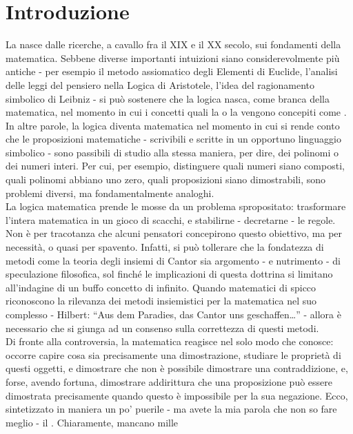 \section{Introduzione}
La  nasce dalle ricerche, a cavallo fra il XIX e il XX secolo, sui fondamenti della matematica. Sebbene diverse importanti intuizioni siano considerevolmente più antiche - per esempio il 
metodo assiomatico degli Elementi di Euclide, l'analisi delle leggi del pensiero nella Logica di Aristotele, l'idea del ragionamento simbolico di Leibniz - si può sostenere che la logica nasca, come branca della matematica, nel momento 
in cui i concetti quali la  o la  vengono concepiti come . In altre parole, la logica diventa matematica nel momento in cui si rende conto che 
le proposizioni matematiche - scrivibili e scritte in un opportuno linguaggio simbolico - sono passibili di studio alla stessa maniera, per dire, dei polinomi o dei numeri interi. Per cui, per esempio,
distinguere quali numeri siano composti, quali polinomi abbiano uno zero, quali proposizioni siano dimostrabili, sono problemi diversi, ma fondamentalmente analoghi.\\
La logica matematica prende le mosse da un problema spropositato: trasformare l'intera matematica in un gioco di scacchi, e stabilirne - decretarne - le regole. Non è per tracotanza che alcuni pensatori concepirono questo obiettivo, ma per necessità, o quasi per spavento.
Infatti, si può tollerare che la fondatezza di metodi come la teoria degli insiemi di Cantor sia argomento - e nutrimento - di speculazione filosofica, sol finché le implicazioni di questa dottrina si limitano all'indagine di un buffo concetto di infinito.
Quando matematici di spicco riconoscono la rilevanza dei metodi insiemistici per la matematica nel suo complesso - Hilbert: ``Aus dem Paradies, das Cantor uns geschaffen\ldots'' - allora è necessario che si giunga ad un consenso sulla correttezza di questi metodi.\\
Di fronte alla controversia, la matematica reagisce nel solo modo che conosce: occorre capire cosa sia precisamente una dimostrazione, studiare le proprietà di questi oggetti, e dimostrare che non è possibile dimostrare una contraddizione, e, forse, avendo fortuna, 
dimostrare addirittura che una proposizione può essere dimostrata precisamente quando questo è impossibile per la sua negazione. Ecco, sintetizzato in maniera un po' puerile - ma avete la mia parola che non so fare meglio - il . Chiaramente, mancano mille
